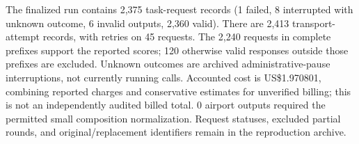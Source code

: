 The finalized run contains 2,375 task-request records (1 failed, 8 interrupted with unknown outcome, 6 invalid outputs, 2,360 valid). There are 2,413 transport-attempt records, with retries on 45 requests. The 2,240 requests in complete prefixes support the reported scores; 120 otherwise valid responses outside those prefixes are excluded. Unknown outcomes are archived administrative-pause interruptions, not currently running calls. Accounted cost is US\$1.970801, combining reported charges and conservative estimates for unverified billing; this is not an independently audited billed total. 0 airport outputs required the permitted small composition normalization. Request statuses, excluded partial rounds, and original/replacement identifiers remain in the reproduction archive.
